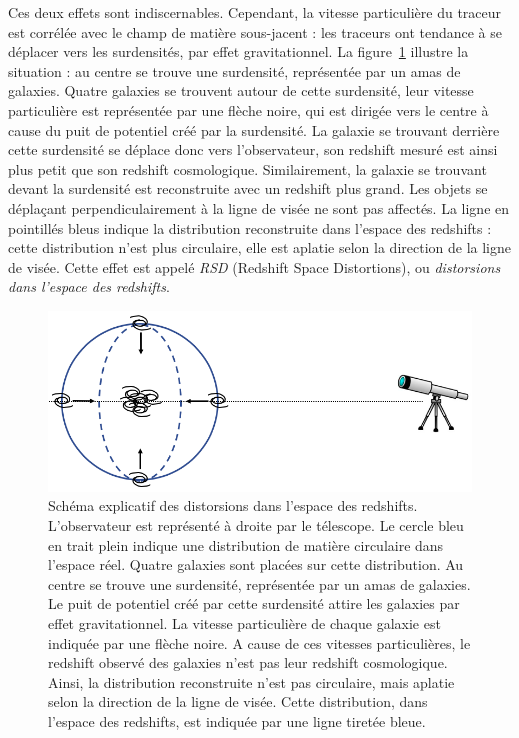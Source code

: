 Ces deux effets sont indiscernables. Cependant, la vitesse particulière du traceur est corrélée avec le champ de matière sous-jacent : les traceurs ont tendance à se déplacer vers les surdensités, par effet gravitationnel. La figure~\ref{fig:schema_rsd} illustre la situation : au centre se trouve une surdensité, représentée par un amas de galaxies. Quatre galaxies se trouvent autour de cette surdensité, leur vitesse particulière est représentée par une flèche noire, qui est dirigée vers le centre à cause du puit de potentiel créé par la surdensité. La galaxie se trouvant derrière cette surdensité se déplace donc vers l'observateur, son redshift mesuré est ainsi plus petit que son redshift cosmologique. Similairement, la galaxie se trouvant devant la surdensité est reconstruite avec un redshift plus grand. Les objets se déplaçant perpendiculairement à la ligne de visée ne sont pas affectés. La ligne en pointillés bleus indique la distribution reconstruite dans l'espace des redshifts : cette distribution n'est plus circulaire, elle est aplatie selon la direction de la ligne de visée. Cette effet est appelé \emph{RSD} (Redshift Space Distortions), ou \emph{distorsions dans l'espace des redshifts}.
\begin{figure}
  \centering
  \includegraphics[scale=0.4]{schema_rsd}
  \caption{Schéma explicatif des distorsions dans l'espace des redshifts. L'observateur est représenté à droite par le télescope. Le cercle bleu en trait plein indique une distribution de matière circulaire dans l'espace réel. Quatre galaxies sont placées sur cette distribution. Au centre se trouve une surdensité, représentée par un amas de galaxies. Le puit de potentiel créé par cette surdensité attire les galaxies par effet gravitationnel. La vitesse particulière de chaque galaxie est indiquée par une flèche noire. A cause de ces vitesses particulières, le redshift observé des galaxies n'est pas leur redshift cosmologique. Ainsi, la distribution reconstruite n'est pas circulaire, mais aplatie selon la direction de la ligne de visée. Cette distribution, dans l'espace des redshifts, est indiquée par une ligne tiretée bleue.}
  \label{fig:schema_rsd}
\end{figure}

